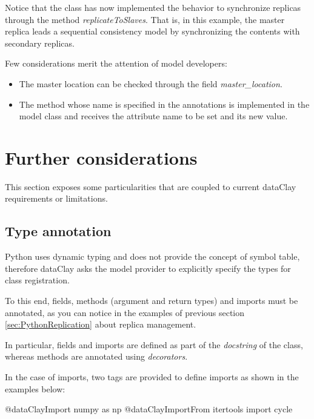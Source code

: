 Notice that the class has now implemented the behavior to synchronize replicas through the method \textit{replicateToSlaves}. That is, in this example, the master replica leads a sequential consistency model by synchronizing the contents with secondary replicas.

Few considerations merit the attention of model developers:

\begin{itemize}
    \item The master location can be checked through the field \textit{master\_location}.
    \item The method whose name is specified in the annotations is implemented in the model class and receives the attribute name to be set and its new value.
\end{itemize}

\section{Further considerations}
\label{sec:PythonConsiderations}

This section exposes some particularities that are coupled to current dataClay requirements or limitations.

\subsection{Type annotation}

Python uses dynamic typing and does not provide the concept of symbol table, therefore dataClay asks the model provider to explicitly specify the types for class registration.

To this end, fields, methods (argument and return types) and imports must be annotated, as you can notice in the examples of previous section \ref{sec:PythonReplication} about replica management. 

In particular, fields and imports are defined as part of the \textit{docstring} of the class, whereas methods are annotated using \textit{decorators}. 

In the case of imports, two tags are provided to define imports as shown in the examples below:

\begin{tBox}
 \begin{python}
  @dataClayImport numpy as np
  @dataClayImportFrom itertools import cycle
 \end{python}
\end{tBox}

